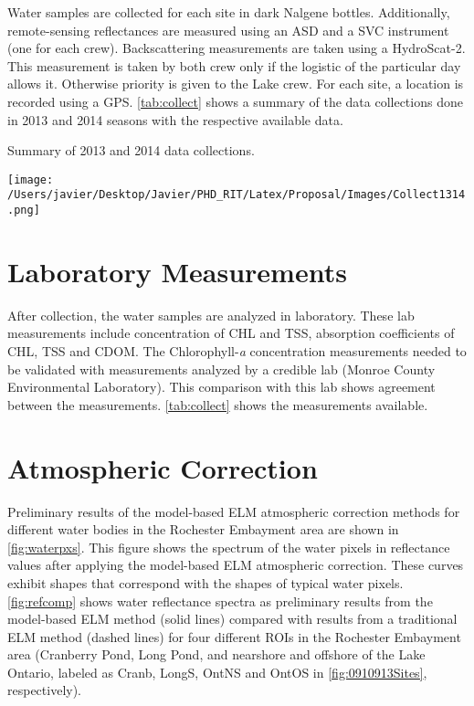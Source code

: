 Water samples are collected for each site in dark Nalgene bottles. Additionally, remote-sensing reflectances are measured using an ASD and a SVC instrument (one for each crew). Backscattering measurements are taken using a HydroScat-2. This measurement is taken by both crew only if the logistic of the particular day allows it. Otherwise priority is given to the Lake crew. For each site, a location is recorded using a GPS. \autoref{tab:collect} shows a summary of the data collections done in 2013 and 2014 seasons with the respective available data.

\begin{table}[htb]
  \caption{Summary of 2013 and 2014 data collections.}
  \centering
  \texttt{[image: /Users/javier/Desktop/Javier/PHD\_RIT/Latex/Proposal/Images/Collect1314.png]}
  \label{tab:collect}
\end{table}

\section{Laboratory Measurements}

After collection, the water samples are analyzed in laboratory. These lab measurements include concentration of CHL and TSS, absorption coefficients of CHL, TSS and CDOM. The Chlorophyll-{\it a} concentration measurements needed to be validated with measurements analyzed by a credible lab (Monroe County Environmental Laboratory). This comparison with this lab shows agreement between the measurements. \autoref{tab:collect} shows the measurements available. 

\section{Atmospheric Correction}

Preliminary results of the model-based ELM atmospheric correction methods for different water bodies in the Rochester Embayment area are shown in \autoref{fig:waterpxs}. This figure shows the spectrum of the water pixels in reflectance values after applying the model-based ELM atmospheric correction. These curves exhibit shapes that correspond with the shapes of typical water pixels. \autoref{fig:refcomp} shows water reflectance spectra as preliminary results from the model-based ELM method (solid lines) compared with results from a traditional ELM method (dashed lines) for four different ROIs in the Rochester Embayment area (Cranberry Pond, Long Pond, and nearshore and offshore of the Lake Ontario, labeled as Cranb, LongS, OntNS and OntOS in \autoref{fig:0910913Sites}, respectively). 

